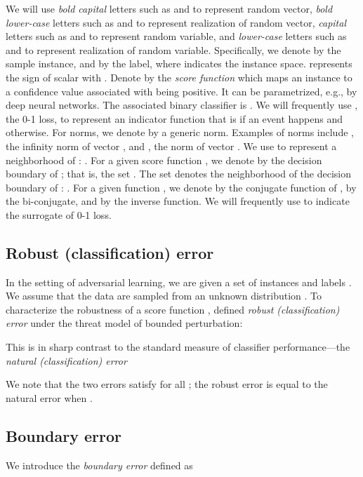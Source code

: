 \documentclass[11pt]{article}
\newcommand{\0}{\mathbf{0}}
\newcommand{\1}{\mathbf{1}}
\begin{document}
We will use \emph{bold capital} letters such as  and  to represent random vector, \emph{bold lower-case} letters such as  and  to represent realization of random vector, \emph{capital} letters such as  and  to represent random variable, and \emph{lower-case} letters such as  and  to represent realization of random variable. Specifically, we denote by  the sample instance, and by  the label, where  indicates the instance space.  represents the sign of scalar  with . Denote by  the \emph{score function} which maps an instance to a confidence value associated with being positive. It can be parametrized, e.g., by deep neural networks. The associated binary classifier is . We will frequently use , the 0-1 loss, to represent an indicator function that is  if an event happens and  otherwise. For norms, we denote by  a generic norm. Examples of norms include , the infinity norm of vector , and , the  norm of vector . We use  to represent a neighborhood of : . For a given score function , we denote by  the decision boundary of ; that is, the set . The set  denotes the neighborhood of the decision boundary of : . For a given function , we denote by  the conjugate function of , by  the bi-conjugate, and by  the inverse function. We will frequently use  to indicate the surrogate of 0-1 loss.

\subsection{Robust (classification) error}

In the setting of adversarial learning, we are given a set of instances  and labels . We assume that the data are sampled from an unknown distribution . To characterize the robustness of a score function , \cite{schmidt2018adversarially,NIPS2018_7307,bubeck2018adversarial1} defined \emph{robust (classification) error} under the threat model of bounded  perturbation:

This is in sharp contrast to the standard measure of  classifier performance---the \emph{natural (classification) error}

We note that the two errors satisfy  for all ; the robust error is equal to the natural error when . 

\subsection{Boundary error}

We introduce the \emph{boundary error} defined as 
\end{document}
